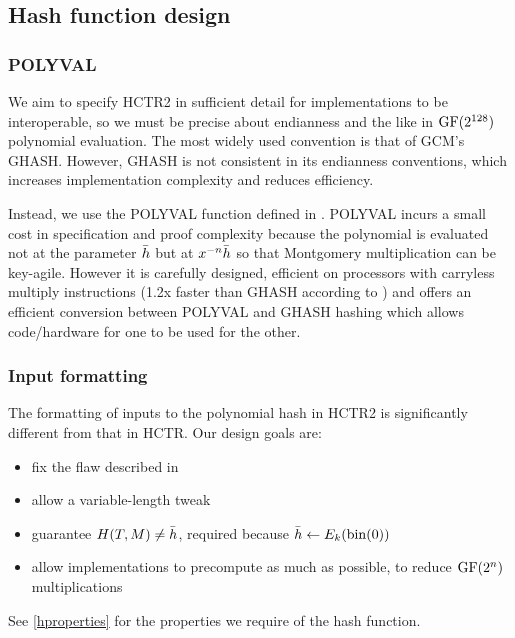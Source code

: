 \documentclass[hctr2.tex]{subfiles}
\begin{document}
\subsection{Hash function design}\label{hashdesign}

\subsubsection{POLYVAL}\label{choosingpolyval}

We aim to specify HCTR2 in sufficient detail
for implementations to be interoperable,
so we must be precise about endianness and the like
in \(\operatorname{GF}(2^{128})\) polynomial evaluation.
The most widely used  convention is that of GCM's GHASH\cite{gcm}.
However, GHASH is not consistent in its endianness conventions,
which increases implementation complexity and reduces efficiency.

Instead, we use the POLYVAL function
defined in \cite{aes_gcm_siv,aes_gcm_siv_rfc}.
POLYVAL incurs a small cost in specification and proof complexity because 
the polynomial is evaluated not at the parameter \(\bar{h}\)
but at \(x^{-n}\bar{h}\)
so that Montgomery multiplication\cite{montmul} can be key-agile.
However it is carefully designed, efficient
on processors with carryless multiply instructions
(1.2x faster than GHASH according to \cite{aes_gcm_siv})
and offers an efficient conversion between POLYVAL and GHASH hashing
which allows code/hardware for one to be used for the other.

\subsubsection{Input formatting}\label{inputformatting}

The formatting of inputs to the polynomial hash in HCTR2 is significantly
different from that in HCTR\@. Our design goals are:

\begin{itemize}
    \item fix the flaw described in \cite{kumarhctr}
    \item allow a variable-length tweak
    \item guarantee \(H(T, M) \neq \bar{h}\), required
    because \(\bar{h} \gets E_k(\operatorname{bin}(0))\)
    \item allow implementations to precompute as much as possible, to reduce \(\operatorname{GF}(2^n)\) multiplications
\end{itemize}

See \autoref{hproperties}
for the properties we require of the hash function.
\end{document}
